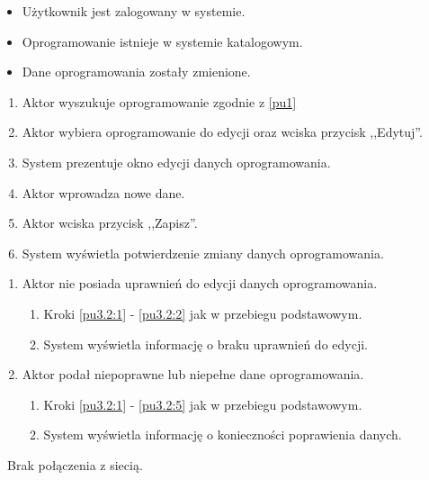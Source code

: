 \begin{itemize}
\item Użytkownik jest zalogowany w systemie.
\item Oprogramowanie istnieje w systemie katalogowym.
\end{itemize}

\begin{itemize}
\item Dane oprogramowania zostały zmienione.
\end{itemize}

\begin{enumerate}
\item \label{pu3.2:1} Aktor wyszukuje oprogramowanie zgodnie z \ref{pu1}
\item \label{pu3.2:2} Aktor wybiera oprogramowanie do edycji oraz wciska przycisk ,,Edytuj''.
\item System prezentuje okno edycji danych oprogramowania.
\item Aktor wprowadza nowe dane.
\item \label{pu3.2:5} Aktor wciska przycisk ,,Zapisz''.
\item System wyświetla potwierdzenie zmiany danych oprogramowania.
\end{enumerate}

\begin{enumerate}
\item Aktor nie posiada uprawnień do edycji danych oprogramowania.
	\begin{enumerate}[label*=\arabic*.]
		\item Kroki \ref{pu3.2:1} - \ref{pu3.2:2} jak w przebiegu podstawowym.
		\item System wyświetla informację o braku uprawnień do edycji.
	\end{enumerate}
\item Aktor podał niepoprawne lub niepełne dane oprogramowania.
	\begin{enumerate}[label*=\arabic*.]
		\item Kroki \ref{pu3.2:1} - \ref{pu3.2:5} jak w przebiegu podstawowym.
		\item System wyświetla informację o konieczności poprawienia danych.
	\end{enumerate}
\end{enumerate}

\
Brak połączenia z siecią.

